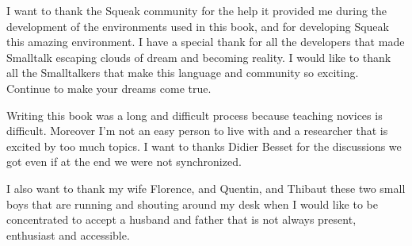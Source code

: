 I want to thank the Squeak community for the help it provided me during the development of the environments used in this book, and for developing Squeak this amazing environment. I have a special thank for all the developers that made Smalltalk escaping clouds of dream and becoming reality. I would like to thank all the Smalltalkers that make this language and community so exciting. Continue to make your dreams come true. 

Writing this book was a long and difficult process because teaching novices is difficult. Moreover I'm not an easy person to live with and a researcher that is excited by too much topics.  I want to thanks Didier Besset for the discussions we got even if at the end we were not synchronized.

I also  want to thank my wife Florence, and Quentin, and Thibaut  these two small boys that are running and shouting around my desk when I would like to be concentrated to accept a husband and father that is not always present, enthusiast and accessible. 

\ifx\wholebook\relax\else\fi

